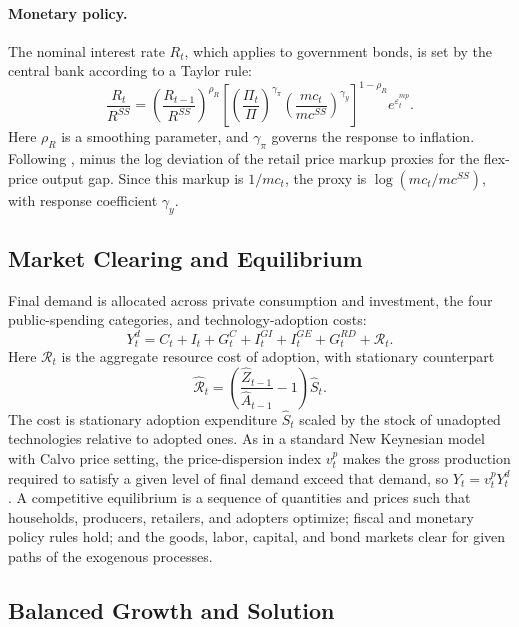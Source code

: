 \documentclass[a4paper,11pt]{article}
\begin{document}
\paragraph{Monetary policy.}
The nominal interest rate $R_t$, which applies to government bonds, is set by the central bank according to a Taylor rule:
\begin{equation} \label{eq:taylor}
    \frac{R_t}{R^{SS}} = \left(\frac{R_{t-1}}{R^{SS}}\right)^{\rho_R}\left[\left(\frac{\Pi_t}{\Pi}\right)^{\gamma_\pi}\left(\frac{mc_t}{mc^{SS}}\right)^{\gamma_y}\right]^{1-\rho_R} e^{\varepsilon_t^{mp}}.
\end{equation}
Here $\rho_R$ is a smoothing parameter, and $\gamma_\pi$ governs the response to inflation.
Following \citet{GertlerKaradi2011}, minus the log deviation of the retail price markup proxies for the flex-price output gap.
Since this markup is $1/mc_t$, the proxy is $\log(mc_t/mc^{SS})$, with response coefficient $\gamma_y$.

\subsection{Market Clearing and Equilibrium}

Final demand is allocated across private consumption and investment, the four public-spending categories, and technology-adoption costs:
\begin{equation} \label{eq:resource}
    Y_t^{d} = C_t + I_t + G_t^{C} + I_t^{GI} + I_t^{GE} + G_t^{RD} + \mathcal{R}_t.
\end{equation}
Here $\mathcal{R}_t$ is the aggregate resource cost of adoption, with stationary counterpart
\begin{equation} \label{eq:adoptioncost}
    \hat{\mathcal{R}}_t=\left(\frac{\hat{Z}_{t-1}}{\hat{A}_{t-1}}-1\right)\hat{S}_t.
\end{equation}
The cost is stationary adoption expenditure $\hat{S}_t$ scaled by the stock of unadopted technologies relative to adopted ones.
As in a standard New Keynesian model with Calvo price setting, the price-dispersion index $v_t^{p}$ makes the gross production required to satisfy a given level of final demand exceed that demand, so $Y_t = v_t^{p}Y_t^{d}$.
A competitive equilibrium is a sequence of quantities and prices such that households, producers, retailers, and adopters optimize; fiscal and monetary policy rules hold; and the goods, labor, capital, and bond markets clear for given paths of the exogenous processes.

\subsection{Balanced Growth and Solution} \label{subsec:bgp}
\end{document}
